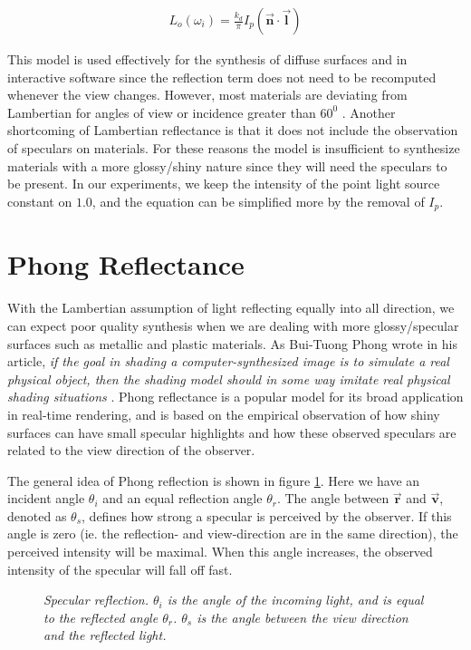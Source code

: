 		\begin{eqnarray*}
			L_o(\omega_i) = \frac{k_d}{\pi}I_p(\vec{\mathbf{n}} \cdot \vec{\mathbf{l}})
		\end{eqnarray*}

This model is used effectively for the synthesis of diffuse surfaces and in interactive software since the reflection term does not need to be recomputed whenever the view changes. However, most materials are deviating from Lambertian for angles of view or incidence greater than $60^0$ \cite{DigitalModeling}. Another shortcoming of Lambertian reflectance is that it does not include the observation of speculars on materials. For these reasons the model is insufficient to synthesize materials with a more glossy/shiny nature since they will need the speculars to be present. In our experiments, we keep the intensity of the point light source constant on $1.0$, and the equation can be simplified more by the removal of $I_p$.

	\section{Phong Reflectance}\label{sec:Phong}
		With the Lambertian assumption of light reflecting equally into all direction, we can expect poor quality synthesis when we are dealing with more glossy/specular surfaces such as metallic and plastic materials. As Bui-Tuong Phong wrote in his article, {\it if the goal in shading a computer-synthesized image is to simulate a real physical object, then the shading model should in some way imitate real physical shading situations} \cite{Phong}. Phong reflectance is a popular model for its broad application in real-time rendering, and is based on the empirical observation of how shiny surfaces can have small specular highlights and how these observed speculars are related to the view direction of the observer.

The general idea of Phong reflection is shown in figure \ref{fig:SPECULAR1}. Here we have an incident angle $\theta_i$ and an equal reflection angle $\theta_r$. The angle between $\vec{\mathbf{r}}$ and $\vec{\mathbf{v}}$, denoted as $\theta_s$, defines how strong a specular is perceived by the observer. If this angle is zero (ie. the reflection- and view-direction are in the same direction), the perceived intensity will be maximal. When this angle increases, the observed intensity of the specular will fall off fast.

\begin{figure}[H]
	\begin{center}
	\end{center}
	\caption{{\it Specular reflection. $\theta_i$ is the angle of the incoming light, and is equal to the reflected angle $\theta_r$. $\theta_s$ is the angle between the view direction and the reflected light.}}
	\label{fig:SPECULAR1}
\end{figure}


